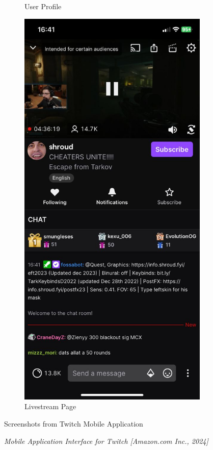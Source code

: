 \begin{figure} [h]
\begin{subfigure}{.3\linewidth}
      \caption{User Profile}
      \label{fig:myfig21}
    \end{subfigure}%
    \hspace{1em}%
    \begin{subfigure}{.3\linewidth}
      \centering
      \includegraphics[width = \linewidth]{mainmatter/images/twitch3.jpg}
      \caption{Livestream Page}
      \label{fig:myfig22}
    \end{subfigure}
    \caption{Screenshots from Twitch Mobile Application}
    \caption*{\textit{Mobile Application Interface for Twitch [Amazon.com Inc., 2024]}}
\end{figure}
